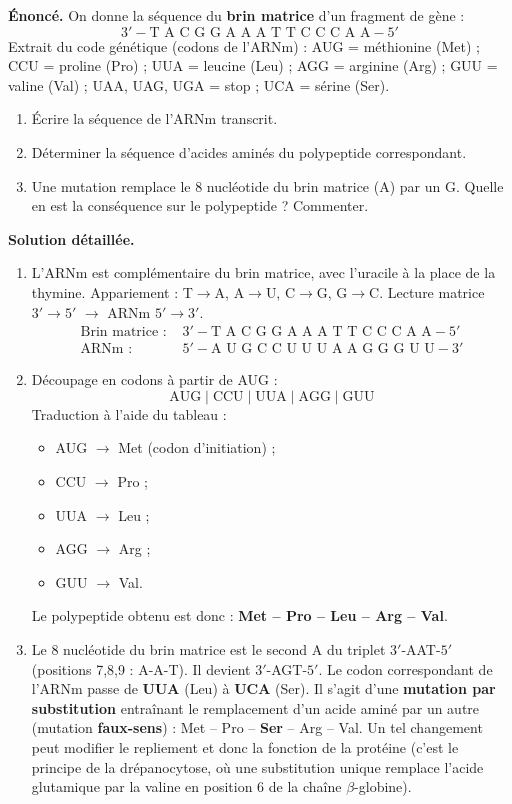 \documentclass[11pt]{article}
\begin{document}
\begin{exoresolu}
\textbf{Énoncé.} On donne la séquence du \textbf{brin matrice} d'un fragment de gène :
\[ 3'-\text{T A C G G A A A T T C C C A A}-5' \]
Extrait du code génétique (codons de l'ARNm) : AUG = méthionine (Met) ; CCU = proline (Pro) ; UUA = leucine (Leu) ; AGG = arginine (Arg) ; GUU = valine (Val) ; UAA, UAG, UGA = stop ; UCA = sérine (Ser).
\begin{enumerate}
\item Écrire la séquence de l'ARNm transcrit.
\item Déterminer la séquence d'acides aminés du polypeptide correspondant.
\item Une mutation remplace le 8\ieme{} nucléotide du brin matrice (A) par un G. Quelle en est la conséquence sur le polypeptide ? Commenter.
\end{enumerate}
\tcblower
\textbf{Solution détaillée.}
\begin{enumerate}
\item L'ARNm est complémentaire du brin matrice, avec l'uracile à la place de la thymine. Appariement : T$\rightarrow$A, A$\rightarrow$U, C$\rightarrow$G, G$\rightarrow$C. Lecture matrice $3'\rightarrow5'$ $\rightarrow$ ARNm $5'\rightarrow3'$.
\begin{align*}
\text{Brin matrice : } & 3'-\text{T A C G G A A A T T C C C A A}-5'\\
\text{ARNm : } & 5'-\text{A U G C C U U U A A G G G U U}-3'
\end{align*}
\item Découpage en codons à partir de AUG :
\[ \text{AUG} \;|\; \text{CCU} \;|\; \text{UUA} \;|\; \text{AGG} \;|\; \text{GUU} \]
Traduction à l'aide du tableau :
\begin{itemize}
\item AUG $\rightarrow$ Met (codon d'initiation) ;
\item CCU $\rightarrow$ Pro ;
\item UUA $\rightarrow$ Leu ;
\item AGG $\rightarrow$ Arg ;
\item GUU $\rightarrow$ Val.
\end{itemize}
Le polypeptide obtenu est donc : \textbf{Met -- Pro -- Leu -- Arg -- Val}.
\item Le 8\ieme{} nucléotide du brin matrice est le second A du triplet $3'$-AAT-$5'$ (positions 7,8,9 : A-A-T). Il devient $3'$-AGT-$5'$. Le codon correspondant de l'ARNm passe de \textbf{UUA} (Leu) à \textbf{UCA} (Ser).
Il s'agit d'une \textbf{mutation par substitution} entraînant le remplacement d'un acide aminé par un autre (mutation \textbf{faux-sens}) : Met -- Pro -- \textbf{Ser} -- Arg -- Val. Un tel changement peut modifier le repliement et donc la fonction de la protéine (c'est le principe de la drépanocytose, où une substitution unique remplace l'acide glutamique par la valine en position 6 de la chaîne $\beta$-globine).

\end{enumerate}
\end{exoresolu}
\end{document}
